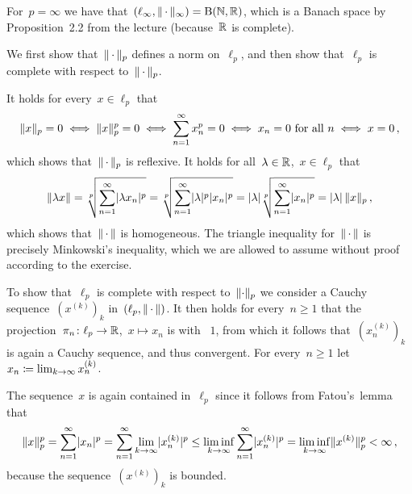 \section{}





\subsection{}

For~$p = \infty$ we have that~$(\ell_\infty, \lVert\,\cdot\,\rVert_\infty) = \operatorname{B}(\mathbb{N}, \mathbb{R})$, which is a Banach space  by Proposition~2.2 from the lecture (because~$\mathbb{R}$ is complete).

We first show that~$\lVert\,\cdot\,\rVert_p$ defines a norm on~$\ell_p$, and then show that~$\ell_p$ is complete with respect to~$\lVert\,\cdot\,\rVert_p$.

It holds for every~$x \in \ell_p$ that
\[
        \lVert x\rVert_p = 0
  \iff  \lVert x\rVert_p^p = 0
  \iff  \sum_{n=1}^\infty x_n^p = 0
  \iff  \text{$x_n = 0$ for all~$n$}
  \iff  x = 0 \,,
\]
which shows that~$\lVert\,\cdot\,\rVert_p$ is reflexive.
It holds for all~$\lambda \in \mathbb{R}$,~$x \in \ell_p$ that
\[
    \lVert\lambda x\rVert
  = \sqrt[p]{ \sum_{n=1}^\infty \lvert\lambda x_n\rvert^p }
  = \sqrt[p]{ \sum_{n=1}^\infty \lvert\lambda\rvert^p \lvert x_n\rvert^p }
  = \lvert\lambda\rvert \sqrt[p]{ \sum_{n=1}^\infty \lvert x_n\rvert^p }
  = \lvert\lambda\rvert \, \lVert x\rVert_p \,,
\]
which shows that~$\lVert\,\cdot\,\rVert$ is homogeneous.
The triangle inequality for~$\lVert\,\cdot\,\rVert$ is precisely Minkowski’s inequality, which we are allowed to assume without proof according to the exercise.

To show that~$\ell_p$ is complete with respect to~$\lVert\cdot\rVert_p$ we consider a Cauchy sequence~$(x^{(k)})_k$ in~$(\ell_p, \lVert\,\cdot\,\rVert)$.
It then holds for every~$n \geq 1$ that the projection~$\pi_n \colon \ell_p \to \mathbb{R}$,~$x \mapsto x_n$ is {\lipcont} with {\lipconst}~$1$, from which it follows that~$(x^{(k)}_n)_k$ is again a Cauchy sequence, and thus convergent.
For every~$n \geq 1$ let~$x_n \coloneqq \lim_{k \to \infty} x^{(k)}_n$.

The sequence~$x$ is again contained in~$\ell_p$ since it follows from Fatou’s~lemma that
\[
        \lVert x\rVert_p^p
  =     \sum_{n=1}^\infty \lvert x_n\rvert^p
  =     \sum_{n=1}^\infty \lim_{k \to \infty} \lvert x_n^{(k)}\rvert^p
  \leq  \liminf_{k \to \infty} \sum_{n=1}^\infty \lvert x_n^{(k)}\rvert^p
  =     \liminf_{k \to \infty} \lVert x^{(k)}\rVert_p^p
  <     \infty \,,
\]
because the sequence~$(x^{(k)})_k$ is bounded.

